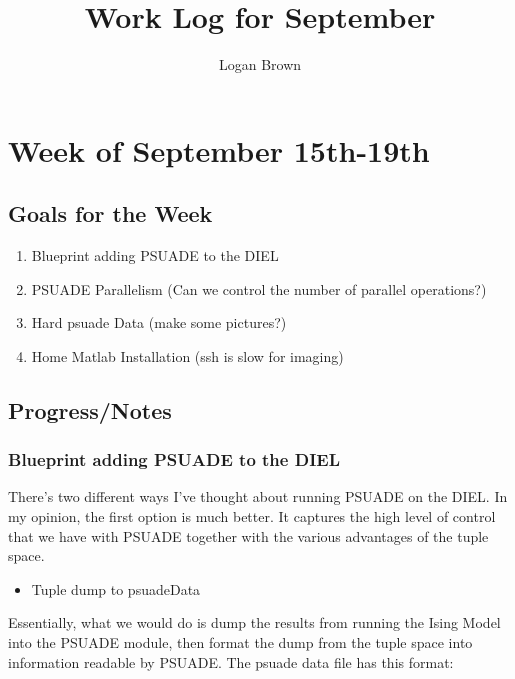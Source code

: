 \documentclass[11pt]{article} %
\title{Work Log for September}
\author{Logan Brown}
\begin{document}
\maketitle


\setcounter{section}{2} %
\setcounter{subsection}{-1}
\setcounter{subsubsection}{0}

\section{Week of September 15th-19th}
\subsection{Goals for the Week}
\begin{enumerate}
	\item Blueprint adding PSUADE to the DIEL
	\item PSUADE Parallelism (Can we control the number of parallel operations?)
	\item Hard psuade Data (make some pictures?)
	\item Home Matlab Installation (ssh is slow for imaging)
\end{enumerate}


\subsection{Progress/Notes}

\subsubsection{Blueprint adding PSUADE to the DIEL}

There's two different ways I've thought about running PSUADE on the DIEL. In my opinion, the first option is much better. It captures the high level of control that we have with PSUADE together with the various advantages of the tuple space.

\begin{itemize}
	\item Tuple dump to psuadeData
\end{itemize}

Essentially, what we would do is dump the results from running the Ising Model into the PSUADE module, then format the dump from the tuple space into information readable by PSUADE. The psuade data file has this format:

\end{document}
